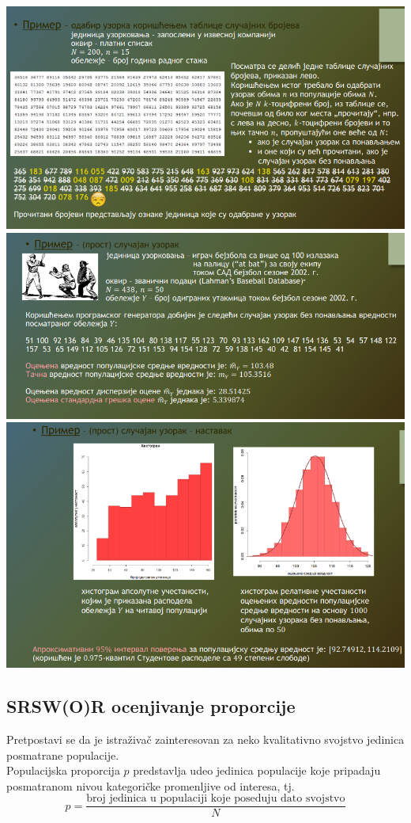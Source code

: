 \documentclass[10pt,a4paper,]{article}
\begin{document}
\includegraphics[scale=0.35]{nedelja_4_1.png}\\
\includegraphics[scale=0.4]{nedelja_4_2.png}\\
\includegraphics[scale=0.4]{nedelja_4_3.png}\\

\subsection{SRSW(O)R ocenjivanje proporcije}
Pretpostavi se da je istraživač zainteresovan za neko kvalitativno svojstvo jedinica 
posmatrane populacije.
\\
Populacijska proporcija $p$ predstavlja udeo jedinica populacije koje 
pripadaju posmatranom nivou kategoričke promenljive od interesa, tj.
$$p = \frac{\text{broj jedinica u populaciji koje poseduju dato svojstvo}}{N}$$
\end{document}
